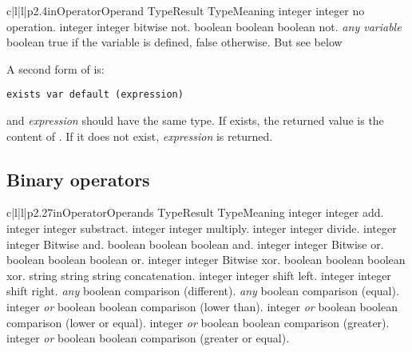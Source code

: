 \begin{longtableiv}{c|l|l|p{2.4in}}{}{Operator}{Operand Type}{Result Type}{Meaning}
  \lineiv{+}
  {integer}
  {integer}
  {no operation.}
  \lineiv{$\sim$}
  {integer}
  {integer}
  {bitwise not.}
  {boolean}
  {boolean}
  {boolean not.}
  {{\em any variable}}
  {boolean}
  {true if the variable is defined, false otherwise. But see below}
\end{longtableiv}

A second form of  is:
 
\begin{lstlisting}
exists var default (expression)
\end{lstlisting}

 and {\em expression} should have the same type. If  exists, the returned value is the content of . If it does not exist, {\em expression} is returned.


\subsection{Binary operators}

\begin{longtableiv}{c|l|l|p{2.27in}}{}{Operator}{Operands Type}{Result Type}{Meaning}
  \lineiv{+}
  {integer}
  {integer}
  {add.}
  \lineiv{-}
  {integer}
  {integer}
  {substract.}
  \lineiv{*}
  {integer}
  {integer}
  {multiply.}
  \lineiv{/}
  {integer}
  {integer}
  {divide.}
  \lineiv{\&}
  {integer}
  {integer}
  {Bitwise and.}
  \lineiv{\&}
  {boolean}
  {boolean}
  {boolean and.}
  \lineiv{$\mid$}
  {integer}
  {integer}
  {Bitwise or.}
  \lineiv{$\mid$}
  {boolean}
  {boolean}
  {boolean or.}
  \lineiv{$\wedge$}
  {integer}
  {integer}
  {Bitwise xor.}
  \lineiv{$\wedge$}
  {boolean}
  {boolean}
  {boolean xor.}
  {string}
  {string}
  {string concatenation.}
  \lineiv{$<<$}
  {integer}
  {integer}
  {shift left.}
  \lineiv{$>>$}
  {integer}
  {integer}
  {shift right.}
  \lineiv{!=}
  {{\em any}}
  {boolean}
  {comparison (different).}
  \lineiv{==}
  {{\em any}}
  {boolean}
  {comparison (equal).}
  \lineiv{$<$}
  {integer {\em or} boolean}
  {boolean}
  {comparison (lower than).}
  \lineiv{$<=$}
  {integer {\em or} boolean}
  {boolean}
  {comparison (lower or equal).}
  \lineiv{$>$}
  {integer {\em or} boolean}
  {boolean}
  {comparison (greater).}
  \lineiv{$>=$}
  {integer {\em or} boolean}
  {boolean}
  {comparison (greater or equal).}
\end{longtableiv}

